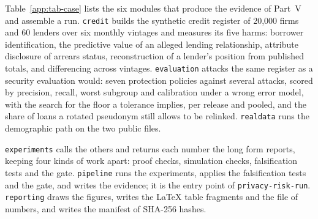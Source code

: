 Table~\ref{app:tab-case} lists the six modules that produce the evidence of Part~V and
assemble a run. \texttt{credit} builds the synthetic credit register of 20{,}000 firms
and 60 lenders over six monthly vintages and measures its five harms: borrower
identification, the predictive value of an alleged lending relationship, attribute
disclosure of arrears status, reconstruction of a lender's position from published
totals, and differencing across vintages. \texttt{evaluation} attacks the same
register as a security evaluation would: seven protection policies against several
attacks, scored by precision, recall, worst subgroup and calibration under a wrong
error model, with the search for the floor a tolerance implies, per release and
pooled, and the share of loans a rotated pseudonym still allows to be relinked.
\texttt{realdata} runs the demographic path on the two public files.

\texttt{experiments} calls the others and returns each number the long form reports,
keeping four kinds of work apart: proof checks, simulation checks, falsification tests
and the gate. \texttt{pipeline} runs the experiments, applies the falsification tests
and the gate, and writes the evidence; it is the entry point of
\texttt{privacy-risk-run}. \texttt{reporting} draws the figures, writes the LaTeX table
fragments and the file of numbers, and writes the manifest of SHA-256 hashes.

